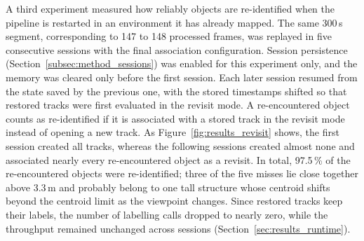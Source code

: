 {\small A third experiment measured how reliably objects are re-identified when the pipeline is restarted in an environment it has already mapped. The same 300\,s segment, corresponding to 147 to 148 processed frames, was replayed in five consecutive sessions with the final association configuration. Session persistence (Section~\ref{subsec:method_sessions}) was enabled for this experiment only, and the memory was cleared only before the first session. Each later session resumed from the state saved by the previous one, with the stored timestamps shifted so that restored tracks were first evaluated in the revisit mode. A re-encountered object counts as re-identified if it is associated with a stored track in the revisit mode instead of opening a new track. As Figure~\ref{fig:results_revisit} shows, the first session created all tracks, whereas the following sessions created almost none and associated nearly every re-encountered object as a revisit. In total, 97.5\,\% of the re-encountered objects were re-identified; three of the five misses lie close together above 3.3\,m and probably belong to one tall structure whose centroid shifts beyond the centroid limit as the viewpoint changes. Since restored tracks keep their labels, the number of labelling calls dropped to nearly zero, while the throughput remained unchanged across sessions (Section~\ref{sec:results_runtime}).\par}

